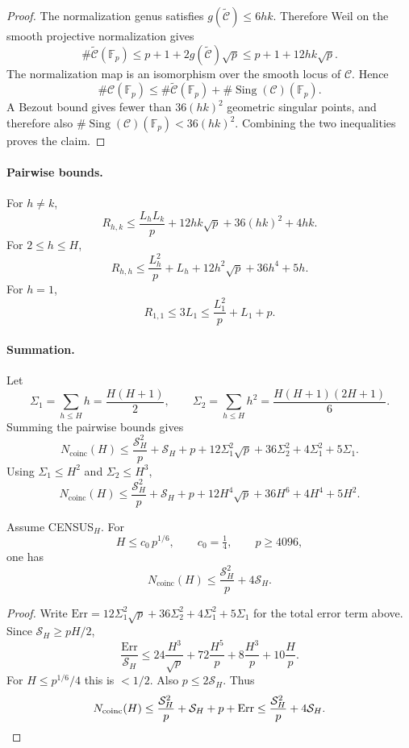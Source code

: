 \begin{proof}
The normalization genus satisfies
$g(\widetilde{\mathcal C})\le6hk$.  Therefore Weil on the smooth
projective normalization gives
\[
 \#\widetilde{\mathcal C}(\mathbb F_p)
 \le p+1+2g(\widetilde{\mathcal C})\sqrt p
 \le p+1+12hk\sqrt p .
\]
The normalization map is an isomorphism over the smooth locus of
$\mathcal C$.  Hence
\[
 \#\mathcal C(\mathbb F_p)
 \le\#\widetilde{\mathcal C}(\mathbb F_p)
   +\#\operatorname{Sing}(\mathcal C)(\mathbb F_p).
\]
A Bezout bound gives fewer than $36(hk)^2$ geometric singular points,
and therefore also
$\#\operatorname{Sing}(\mathcal C)(\mathbb F_p)<36(hk)^2$.  Combining
the two inequalities proves the claim.
\end{proof}

\paragraph{Pairwise bounds.}
For $h\ne k$,
\[
 R_{h,k}
 \le\frac{L_hL_k}{p}
 +12hk\sqrt p
 +36(hk)^2
 +4hk .
\]
For $2\le h\le H$,
\[
 R_{h,h}
 \le\frac{L_h^2}{p}
 +L_h
 +12h^2\sqrt p
 +36h^4
 +5h .
\]
For $h=1$,
\[
 R_{1,1}\le3L_1\le\frac{L_1^2}{p}+L_1+p .
\]

\paragraph{Summation.}
Let
\[
 \Sigma_1=\sum_{h\le H}h=\frac{H(H+1)}2,
 \qquad
 \Sigma_2=\sum_{h\le H}h^2=\frac{H(H+1)(2H+1)}6 .
\]
Summing the pairwise bounds gives
\[
 N_{\mathrm{coinc}}(H)
 \le\frac{\mathcal S_H^2}{p}+\mathcal S_H+p
 +12\Sigma_1^2\sqrt p
 +36\Sigma_2^2
 +4\Sigma_1^2
 +5\Sigma_1 .
\]
Using $\Sigma_1\le H^2$ and $\Sigma_2\le H^3$,
\[
 N_{\mathrm{coinc}}(H)
 \le\frac{\mathcal S_H^2}{p}+\mathcal S_H+p
 +12H^4\sqrt p
 +36H^6
 +4H^4
 +5H^2 .
\]

\begin{theorem}
\label{thm:p16-main}
Assume CENSUS$_H$.  For
\[
 H\le c_0\,p^{1/6},
 \qquad c_0=\tfrac14,
 \qquad p\ge4096,
\]
one has
\[
 \boxed{\
 N_{\mathrm{coinc}}(H)\le\frac{\mathcal S_H^2}{p}+4\mathcal S_H.\ }
\]
\end{theorem}

\begin{proof}
Write
$\mathrm{Err}=12\Sigma_1^2\sqrt p+36\Sigma_2^2+4\Sigma_1^2+5\Sigma_1$
for the total error term above.  Since $\mathcal S_H\ge pH/2$,
\[
 \frac{\mathrm{Err}}{\mathcal S_H}
 \le24\frac{H^3}{\sqrt p}
 +72\frac{H^5}{p}
 +8\frac{H^3}{p}
 +10\frac{H}{p}.
\]
For $H\le p^{1/6}/4$ this is $<1/2$.  Also $p\le2\mathcal S_H$.  Thus
\[
 N_{\mathrm{coinc}}(H)
 \le\frac{\mathcal S_H^2}{p}+\mathcal S_H+p+\mathrm{Err}
 \le\frac{\mathcal S_H^2}{p}+4\mathcal S_H. \qedhere
\]
\end{proof}

